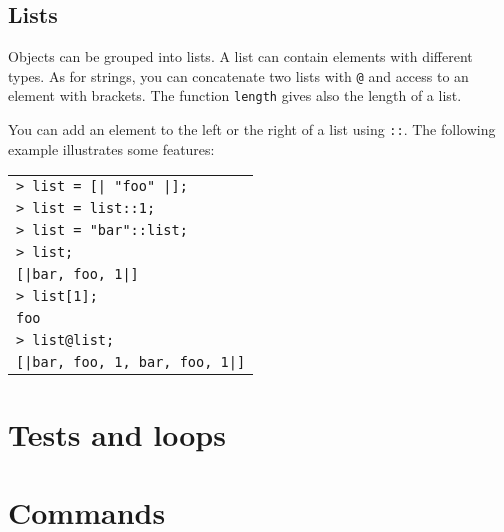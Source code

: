 \documentclass[a4paper]{article}
\newcommand{\com}[1]{\texttt{#1}}
\newcommand{\code}[1]{\begin{center}
\begin{tabular}{|p{14.8cm}|}
\hline
#1
\hline
\end{tabular}
\end{center}
}
\newcommand{\ligne}[1]{\texttt{#1}\\}
\begin{document}
\subsection{Lists}
Objects can be grouped into lists. A list can contain elements with different types. As for strings, you can concatenate two lists with \com{@} and access to an element with brackets. The function \com{length} gives also the length of a list.

You can add an element to the left or the right of a list using \com{::}. The following example illustrates some features:

\code{
\ligne{> list = [| "foo" |];}
\ligne{> list = list::1;}
\ligne{> list = "bar"::list;}
\ligne{> list;}
\ligne{[|bar, foo, 1|]}
\ligne{> list[1];}
\ligne{foo}
\ligne{> list@list;}
\ligne{[|bar, foo, 1, bar, foo, 1|]}
}

\section{Tests and loops}

\section{Commands}
\end{document}
